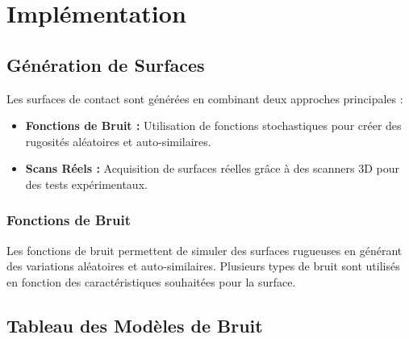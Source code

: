 \chapter{Impl\'ementation}

\section{Génération de Surfaces}
Les surfaces de contact sont générées en combinant deux approches principales :
\begin{itemize}
    \item \textbf{Fonctions de Bruit :} Utilisation de fonctions stochastiques pour créer des rugosités aléatoires et auto-similaires.
    \item \textbf{Scans Réels :} Acquisition de surfaces réelles grâce à des scanners 3D pour des tests expérimentaux.
\end{itemize}

\subsection{Fonctions de Bruit}
Les fonctions de bruit permettent de simuler des surfaces rugueuses en générant des variations aléatoires et auto-similaires. Plusieurs types de bruit sont utilisés en fonction des caractéristiques souhaitées pour la surface.

\section{Tableau des Modèles de Bruit}

